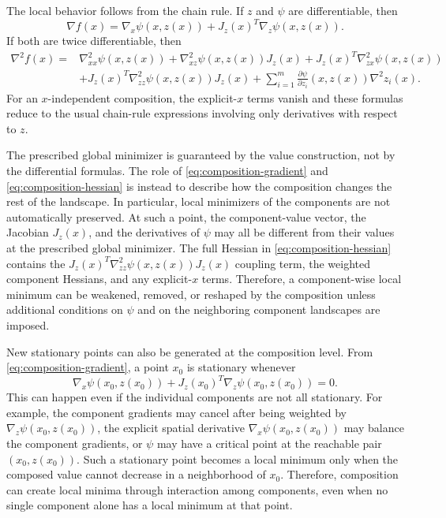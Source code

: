 \documentclass[11pt,a4paper]{article}
\theoremstyle{remark}
\theoremstyle{plain}
\begin{document}
The local behavior follows from the chain rule. If \(z\) and \(\psi\) are
differentiable, then
\begin{equation}
	\nabla f(x)
	=
	\nabla_x\psi(x,z(x))
	+
	J_z(x)^T\nabla_z\psi(x,z(x)).
	\label{eq:composition-gradient}
\end{equation}
If both are twice differentiable, then
\begin{align}
	\nabla^2 f(x)
	={}&
	\nabla_{xx}^2\psi(x,z(x))
	+
	\nabla_{xz}^2\psi(x,z(x))J_z(x)
	+
	J_z(x)^T\nabla_{zx}^2\psi(x,z(x))
	\nonumber\\
	&+
	J_z(x)^T\nabla_{zz}^2\psi(x,z(x))J_z(x)
	+
	\sum_{i=1}^m
	\frac{\partial\psi}{\partial z_i}(x,z(x))\nabla^2 z_i(x).
	\label{eq:composition-hessian}
\end{align}
For an \(x\)-independent composition, the explicit-\(x\) terms vanish and
these formulas reduce to the usual chain-rule expressions involving only
derivatives with respect to \(z\).

The prescribed global minimizer is guaranteed by the value construction, not by
the differential formulas. The role of
\eqref{eq:composition-gradient} and \eqref{eq:composition-hessian} is instead
to describe how the composition changes the rest of the landscape. In
particular, local minimizers of the components are not automatically preserved.
At such a point, the component-value vector, the Jacobian \(J_z(x)\), and the
derivatives of \(\psi\) may all be different from their values at the prescribed
global minimizer. The full Hessian in
\eqref{eq:composition-hessian} contains the
\(J_z(x)^T\nabla_{zz}^2\psi(x,z(x))J_z(x)\) coupling term, the weighted
component Hessians, and any explicit-\(x\) terms. Therefore, a component-wise
local minimum can be weakened, removed, or reshaped by the composition unless
additional conditions on \(\psi\) and on the neighboring component landscapes
are imposed.

New stationary points can also be generated at the composition level. From
\eqref{eq:composition-gradient}, a point \(x_0\) is stationary whenever
\[
	\nabla_x\psi(x_0,z(x_0))
	+
	J_z(x_0)^T\nabla_z\psi(x_0,z(x_0))=0.
\]
This can happen even if the individual components are not all stationary. For
example, the component gradients may cancel after being weighted by
\(\nabla_z\psi(x_0,z(x_0))\), the explicit spatial derivative
\(\nabla_x\psi(x_0,z(x_0))\) may balance the component gradients, or \(\psi\)
may have a critical point at the reachable pair \((x_0,z(x_0))\). Such a
stationary point becomes a local minimum only when the composed value cannot
decrease in a neighborhood of \(x_0\). Therefore, composition can create local
minima through interaction among components, even when no single component
alone has a local minimum at that point.
\end{document}

